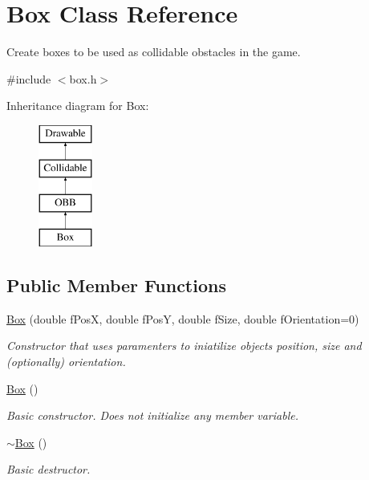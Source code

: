 \hypertarget{class_box}{}\section{Box Class Reference}
\label{class_box}


Create boxes to be used as collidable obstacles in the game.  




{\ttfamily \#include $<$box.\+h$>$}

Inheritance diagram for Box\+:\begin{figure}[H]
\begin{center}
\leavevmode
\includegraphics[height=4.000000cm]{class_box}
\end{center}
\end{figure}
\subsection*{Public Member Functions}
\begin{DoxyCompactItemize}
\item 
\hyperlink{class_box_abbd9e77b3e9400ef44c6d52e0682b9d9}{Box} (double f\+Pos\+X, double f\+Pos\+Y, double f\+Size, double f\+Orientation=0)
\begin{DoxyCompactList}\small\item\em Constructor that uses paramenters to iniatilize object\textquotesingle{}s position, size and (optionally) orientation. \end{DoxyCompactList}\item 
\hypertarget{class_box_aca78d7db44972bfa78d46b7bbc8796f6}{}\hyperlink{class_box_aca78d7db44972bfa78d46b7bbc8796f6}{Box} ()\label{class_box_aca78d7db44972bfa78d46b7bbc8796f6}

\begin{DoxyCompactList}\small\item\em Basic constructor. Does not initialize any member variable. \end{DoxyCompactList}\item 
\hypertarget{class_box_a6a5e09398e85d602a046b429062fb9c2}{}\hyperlink{class_box_a6a5e09398e85d602a046b429062fb9c2}{$\sim$\+Box} ()\label{class_box_a6a5e09398e85d602a046b429062fb9c2}

\begin{DoxyCompactList}\small\item\em Basic destructor. \end{DoxyCompactList}\end{DoxyCompactItemize}
